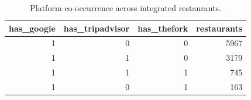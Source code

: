 \begin{table}[ht]
\centering
\caption{Platform co-occurrence across integrated restaurants.}
\label{tab:q0_platform_coverage}
{\tiny
\begin{tabular}{rrrr}
\toprule
has\_google & has\_tripadvisor & has\_thefork & restaurants \\
\midrule
1 & 0 & 0 & 5967 \\
1 & 1 & 0 & 3179 \\
1 & 1 & 1 & 745 \\
1 & 0 & 1 & 163 \\
\bottomrule
\end{tabular}
}
\end{table}
